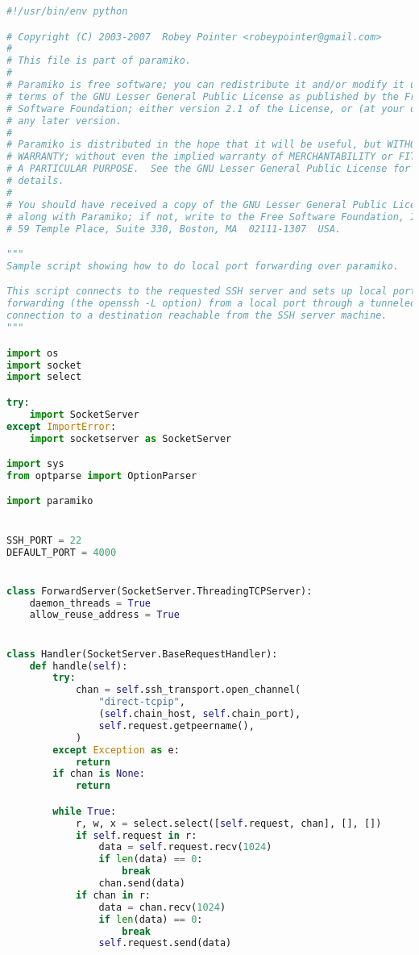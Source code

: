 \begin{lstlisting}[language=Python,caption={Python Script to Set Up a SSH Tunnel.},label=code:evaluation:forward-tunnel]
#!/usr/bin/env python

# Copyright (C) 2003-2007  Robey Pointer <robeypointer@gmail.com>
#
# This file is part of paramiko.
#
# Paramiko is free software; you can redistribute it and/or modify it under the
# terms of the GNU Lesser General Public License as published by the Free
# Software Foundation; either version 2.1 of the License, or (at your option)
# any later version.
#
# Paramiko is distributed in the hope that it will be useful, but WITHOUT ANY
# WARRANTY; without even the implied warranty of MERCHANTABILITY or FITNESS FOR
# A PARTICULAR PURPOSE.  See the GNU Lesser General Public License for more
# details.
#
# You should have received a copy of the GNU Lesser General Public License
# along with Paramiko; if not, write to the Free Software Foundation, Inc.,
# 59 Temple Place, Suite 330, Boston, MA  02111-1307  USA.

"""
Sample script showing how to do local port forwarding over paramiko.

This script connects to the requested SSH server and sets up local port
forwarding (the openssh -L option) from a local port through a tunneled
connection to a destination reachable from the SSH server machine.
"""

import os
import socket
import select

try:
    import SocketServer
except ImportError:
    import socketserver as SocketServer

import sys
from optparse import OptionParser

import paramiko


SSH_PORT = 22
DEFAULT_PORT = 4000


class ForwardServer(SocketServer.ThreadingTCPServer):
    daemon_threads = True
    allow_reuse_address = True


class Handler(SocketServer.BaseRequestHandler):
    def handle(self):
        try:
            chan = self.ssh_transport.open_channel(
                "direct-tcpip",
                (self.chain_host, self.chain_port),
                self.request.getpeername(),
            )
        except Exception as e:
            return
        if chan is None:
            return

        while True:
            r, w, x = select.select([self.request, chan], [], [])
            if self.request in r:
                data = self.request.recv(1024)
                if len(data) == 0:
                    break
                chan.send(data)
            if chan in r:
                data = chan.recv(1024)
                if len(data) == 0:
                    break
                self.request.send(data)


\end{lstlisting}
